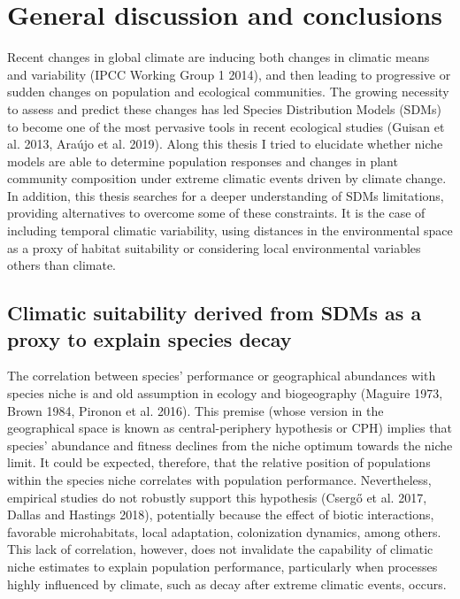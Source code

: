 \documentclass[11pt,twoside]{reedthesis}
\begin{document}
\chapter[General discussion and conclusions]{General discussion and conclusions}

\setlength{\parskip}{0.2cm plus4mm minus3mm}

\newpage

\setlength{\parindent}{0pt} Recent changes in global climate are
inducing both changes in climatic means and variability (IPCC Working
Group 1 2014), and then leading to progressive or sudden changes on
population and ecological communities. The growing necessity to assess
and predict these changes has led Species Distribution Models (SDMs) to
become one of the most pervasive tools in recent ecological studies
(Guisan et al. 2013, Araújo et al. 2019). Along this thesis I tried to
elucidate whether niche models are able to determine population
responses and changes in plant community composition under extreme
climatic events driven by climate change. In addition, this thesis
searches for a deeper understanding of SDMs limitations, providing
alternatives to overcome some of these constraints. It is the case of
including temporal climatic variability, using distances in the
environmental space as a proxy of habitat suitability or considering
local environmental variables others than climate. \par

\section{Climatic suitability derived from SDMs as a proxy to explain
species
decay}\label{climatic-suitability-derived-from-sdms-as-a-proxy-to-explain-species-decay}

The correlation between species' performance or geographical abundances
with species niche is and old assumption in ecology and biogeography
(Maguire 1973, Brown 1984, Pironon et al. 2016). This premise (whose
version in the geographical space is known as central-periphery
hypothesis or CPH) implies that species' abundance and fitness declines
from the niche optimum towards the niche limit. It could be expected,
therefore, that the relative position of populations within the species
niche correlates with population performance. Nevertheless, empirical
studies do not robustly support this hypothesis (Csergő et al. 2017,
Dallas and Hastings 2018), potentially because the effect of biotic
interactions, favorable microhabitats, local adaptation, colonization
dynamics, among others. This lack of correlation, however, does not
invalidate the capability of climatic niche estimates to explain
population performance, particularly when processes highly influenced by
climate, such as decay after extreme climatic events, occurs. \par
\setlength{\parindent}{30pt}
\end{document}
